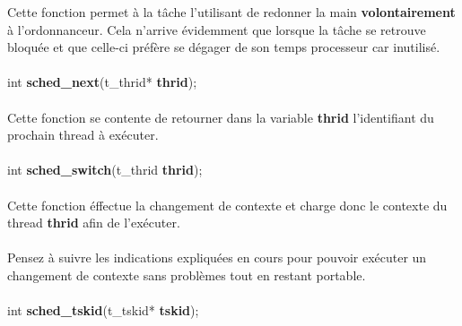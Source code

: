 \documentclass[10pt,a4wide]{article}
\begin{document}
Cette fonction permet \`a la t\^ache l'utilisant de redonner la main
\textbf{volontairement} \`a l'ordonnanceur. Cela n'arrive \'evidemment
que lorsque la t\^ache se retrouve bloqu\'ee et que celle-ci pr\'ef\`ere
se d\'egager de son temps processeur car inutilis\'e.

\paragraph{}

\hspace{1.5cm}int \textbf{sched\_next}(t\_thrid* \textbf{thrid});

\paragraph{}

Cette fonction se contente de retourner dans la variable \textbf{thrid}
l'identifiant du prochain thread \`a ex\'ecuter.

\paragraph{}

\hspace{1.5cm}int \textbf{sched\_switch}(t\_thrid \textbf{thrid});

\paragraph{}

Cette fonction \'effectue la changement de contexte et charge donc le contexte
du thread \textbf{thrid} afin de l'ex\'ecuter.

\paragraph{}

Pensez \`a suivre les indications expliqu\'ees en cours pour pouvoir
ex\'ecuter un changement de contexte sans probl\`emes tout en restant
portable.

\paragraph{}

\hspace{1.5cm}int \textbf{sched\_tskid}(t\_tskid* \textbf{tskid});

\paragraph{}
\end{document}
